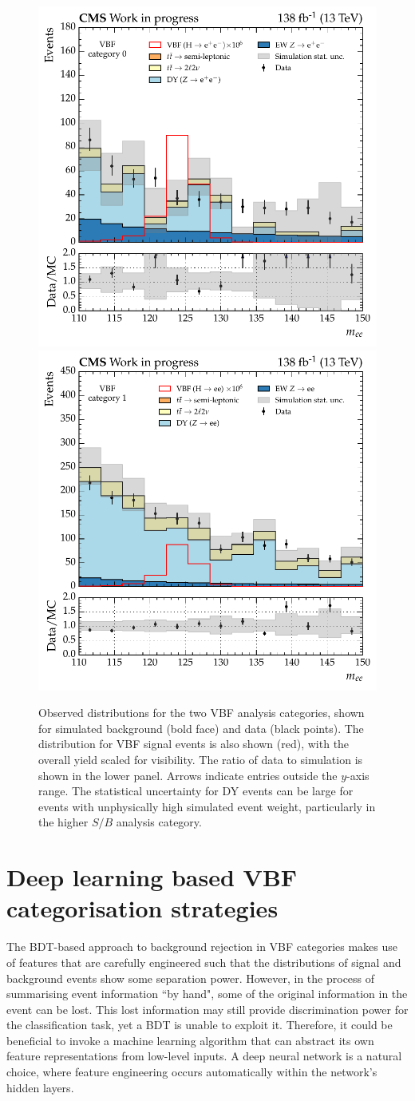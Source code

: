 \begin{figure}[htbp!]
\centering
\includegraphics[width =0.48\linewidth]{Figures/Hee/VBF/MeePlots/VBF_BDT_dielectronMass_cat0.pdf}\hfill%
\includegraphics[width =0.48\linewidth]{Figures/Hee/VBF/MeePlots/VBF_BDT_dielectronMass_cat1.pdf}\hfill%
\caption[The dielectron mass distributions for analysis categories targeting VBF events.]{Observed \mee distributions for the two VBF analysis categories, shown for simulated background (bold face) and data (black points). The distribution for VBF signal events is also shown (red), with the overall yield scaled for visibility. The ratio of data to simulation is shown in the lower panel. Arrows indicate entries outside the $y$-axis range. The statistical uncertainty for DY events can be large for events with unphysically high simulated event weight, particularly in the higher $S/B$ analysis category.}
\label{fig:vbf_mee_dataMC}
\end{figure} 

\section{Deep learning based VBF categorisation strategies}
\label{subsec:vbf_lstm}

The BDT-based approach to background rejection in VBF categories makes use of features that are carefully engineered such that the distributions of signal and background events show
some separation power. However, in the process of summarising event information ``by hand", some of the original information in the event can be lost. This lost information may still provide discrimination power for the classification task, yet a BDT is unable to exploit it.
Therefore, it could be beneficial to invoke a machine learning algorithm that can abstract its own feature representations from low-level inputs. A deep neural network is a natural choice, where feature engineering occurs automatically within 
the network's hidden layers.



